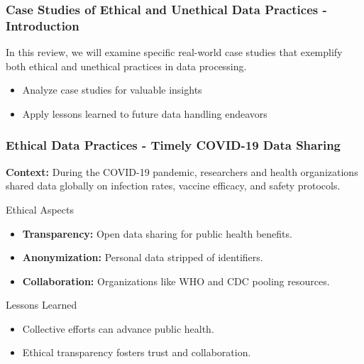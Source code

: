 \documentclass[aspectratio=169]{beamer}
\begin{document}
\begin{frame}[fragile]
    \frametitle{Case Studies of Ethical and Unethical Data Practices - Introduction}
    
    In this review, we will examine specific real-world case studies that exemplify both ethical and unethical practices in data processing. 
    \begin{itemize}
        \item Analyze case studies for valuable insights
        \item Apply lessons learned to future data handling endeavors
    \end{itemize}
\end{frame}

\begin{frame}[fragile]
    \frametitle{Ethical Data Practices - Timely COVID-19 Data Sharing}
    
    \textbf{Context:} During the COVID-19 pandemic, researchers and health organizations shared data globally on infection rates, vaccine efficacy, and safety protocols.
    
    \begin{block}{Ethical Aspects}
        \begin{itemize}
            \item \textbf{Transparency:} Open data sharing for public health benefits.
            \item \textbf{Anonymization:} Personal data stripped of identifiers.
            \item \textbf{Collaboration:} Organizations like WHO and CDC pooling resources.
        \end{itemize}
    \end{block}
    
    \begin{block}{Lessons Learned}
        \begin{itemize}
            \item Collective efforts can advance public health.
            \item Ethical transparency fosters trust and collaboration.
        \end{itemize}
    \end{block}
\end{frame}
\end{document}
